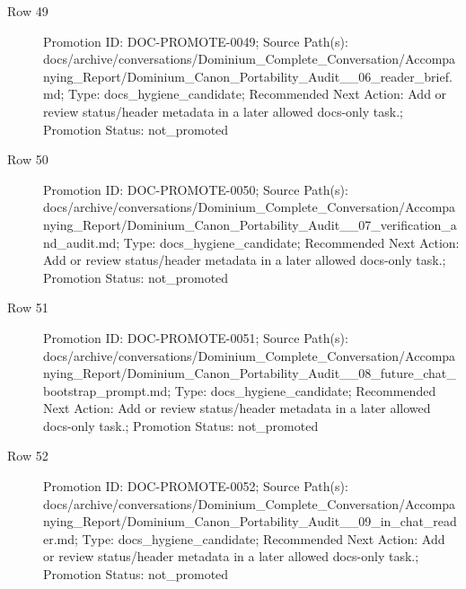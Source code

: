 \documentclass[9pt,a4paper,openany]{book}
\begin{document}
\begin{description}
\item[Row 49] Promotion ID: DOC-\allowbreak{}PROMOTE-\allowbreak{}0049; Source Path(s): docs/\allowbreak{}archive/\allowbreak{}conversations/\allowbreak{}Dominium\_\allowbreak{}Complete\_\allowbreak{}Conversation/\allowbreak{}Accompanying\_\allowbreak{}Report/\allowbreak{}Dominium\_\allowbreak{}Canon\_\allowbreak{}Portability\_\allowbreak{}Audit\_\allowbreak{}\_\allowbreak{}06\_\allowbreak{}reader\_\allowbreak{}brief.\allowbreak{}md; Type: docs\_\allowbreak{}hygiene\_\allowbreak{}candidate; Recommended Next Action: Add or review status/\allowbreak{}header metadata in a later allowed docs-\allowbreak{}only task.\allowbreak{}; Promotion Status: not\_\allowbreak{}promoted
\item[Row 50] Promotion ID: DOC-\allowbreak{}PROMOTE-\allowbreak{}0050; Source Path(s): docs/\allowbreak{}archive/\allowbreak{}conversations/\allowbreak{}Dominium\_\allowbreak{}Complete\_\allowbreak{}Conversation/\allowbreak{}Accompanying\_\allowbreak{}Report/\allowbreak{}Dominium\_\allowbreak{}Canon\_\allowbreak{}Portability\_\allowbreak{}Audit\_\allowbreak{}\_\allowbreak{}07\_\allowbreak{}verification\_\allowbreak{}and\_\allowbreak{}audit.\allowbreak{}md; Type: docs\_\allowbreak{}hygiene\_\allowbreak{}candidate; Recommended Next Action: Add or review status/\allowbreak{}header metadata in a later allowed docs-\allowbreak{}only task.\allowbreak{}; Promotion Status: not\_\allowbreak{}promoted
\item[Row 51] Promotion ID: DOC-\allowbreak{}PROMOTE-\allowbreak{}0051; Source Path(s): docs/\allowbreak{}archive/\allowbreak{}conversations/\allowbreak{}Dominium\_\allowbreak{}Complete\_\allowbreak{}Conversation/\allowbreak{}Accompanying\_\allowbreak{}Report/\allowbreak{}Dominium\_\allowbreak{}Canon\_\allowbreak{}Portability\_\allowbreak{}Audit\_\allowbreak{}\_\allowbreak{}08\_\allowbreak{}future\_\allowbreak{}chat\_\allowbreak{}bootstrap\_\allowbreak{}prompt.\allowbreak{}md; Type: docs\_\allowbreak{}hygiene\_\allowbreak{}candidate; Recommended Next Action: Add or review status/\allowbreak{}header metadata in a later allowed docs-\allowbreak{}only task.\allowbreak{}; Promotion Status: not\_\allowbreak{}promoted
\item[Row 52] Promotion ID: DOC-\allowbreak{}PROMOTE-\allowbreak{}0052; Source Path(s): docs/\allowbreak{}archive/\allowbreak{}conversations/\allowbreak{}Dominium\_\allowbreak{}Complete\_\allowbreak{}Conversation/\allowbreak{}Accompanying\_\allowbreak{}Report/\allowbreak{}Dominium\_\allowbreak{}Canon\_\allowbreak{}Portability\_\allowbreak{}Audit\_\allowbreak{}\_\allowbreak{}09\_\allowbreak{}in\_\allowbreak{}chat\_\allowbreak{}reader.\allowbreak{}md; Type: docs\_\allowbreak{}hygiene\_\allowbreak{}candidate; Recommended Next Action: Add or review status/\allowbreak{}header metadata in a later allowed docs-\allowbreak{}only task.\allowbreak{}; Promotion Status: not\_\allowbreak{}promoted

\end{description}
\end{document}
